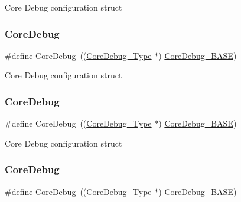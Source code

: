 Core Debug configuration struct \mbox{\label{group___c_m_s_i_s__core__base_gab6e30a2b802d9021619dbb0be7f5d63d}} 
\subsubsection{\texorpdfstring{Core\+Debug}{CoreDebug}\hspace{0.1cm}{\footnotesize\ttfamily [2/4]}}
{\footnotesize\ttfamily \#define Core\+Debug~((\mbox{\hyperlink{struct_core_debug___type}{Core\+Debug\+\_\+\+Type}} $\ast$)     \mbox{\hyperlink{group___c_m_s_i_s__core__base_ga680604dbcda9e9b31a1639fcffe5230b}{Core\+Debug\+\_\+\+B\+A\+SE}})}

Core Debug configuration struct \mbox{\label{group___c_m_s_i_s__core__base_gab6e30a2b802d9021619dbb0be7f5d63d}} 
\subsubsection{\texorpdfstring{Core\+Debug}{CoreDebug}\hspace{0.1cm}{\footnotesize\ttfamily [3/4]}}
{\footnotesize\ttfamily \#define Core\+Debug~((\mbox{\hyperlink{struct_core_debug___type}{Core\+Debug\+\_\+\+Type}} $\ast$)     \mbox{\hyperlink{group___c_m_s_i_s__core__base_ga680604dbcda9e9b31a1639fcffe5230b}{Core\+Debug\+\_\+\+B\+A\+SE}})}

Core Debug configuration struct \mbox{\label{group___c_m_s_i_s__core__base_gab6e30a2b802d9021619dbb0be7f5d63d}} 
\subsubsection{\texorpdfstring{Core\+Debug}{CoreDebug}\hspace{0.1cm}{\footnotesize\ttfamily [4/4]}}
{\footnotesize\ttfamily \#define Core\+Debug~((\mbox{\hyperlink{struct_core_debug___type}{Core\+Debug\+\_\+\+Type}} $\ast$)     \mbox{\hyperlink{group___c_m_s_i_s__core__base_ga680604dbcda9e9b31a1639fcffe5230b}{Core\+Debug\+\_\+\+B\+A\+SE}})}

